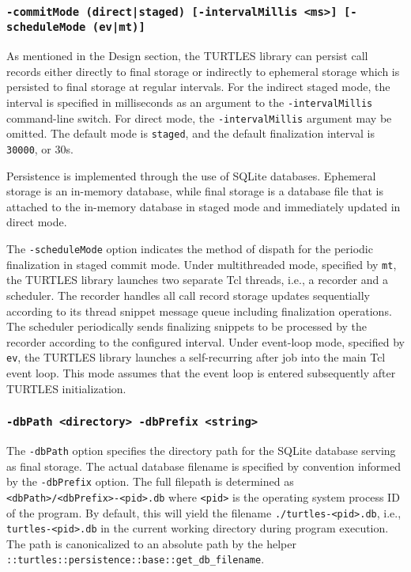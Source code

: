 \documentclass{article}[letter,10pt]
\begin{document}
{{    \subsubsection{\texttt{-commitMode (direct|staged) [-intervalMillis <ms>] [-scheduleMode (ev|mt)]}}{
      As mentioned in the Design section, the TURTLES library can persist call records
      either directly to final storage or indirectly to ephemeral storage which is
      persisted to final storage at regular intervals. For the indirect staged mode,
      the interval is specified in milliseconds as an argument to the \texttt{-intervalMillis}
      command-line switch. For direct mode, the \texttt{-intervalMillis} argument may be
      omitted. The default mode is \texttt{staged}, and the default finalization
      interval is \texttt{30000}, or 30s.

      Persistence is implemented through the use of SQLite databases. Ephemeral
      storage is an in-memory database, while final storage is a database file
      that is attached to the in-memory database in staged mode and immediately
      updated in direct mode.

      The \texttt{-scheduleMode} option indicates the method of dispath for the periodic
      finalization in staged commit mode. Under multithreaded mode, specified by \texttt{mt},
      the TURTLES library launches two separate Tcl threads, i.e., a recorder and a scheduler.
      The recorder handles all call record storage updates sequentially according to its thread
      snippet message queue including finalization operations. The scheduler periodically sends
      finalizing snippets to be processed by the recorder according to the configured interval.
      Under event-loop mode, specified by \texttt{ev}, the TURTLES library launches a self-recurring
      after job into the main Tcl event loop. This mode assumes that the event loop is entered
      subsequently after TURTLES initialization.
    }
    \subsubsection{\texttt{-dbPath <directory> -dbPrefix <string>}}{
      The \texttt{-dbPath} option specifies the directory path for the SQLite database serving
      as final storage. The actual database filename is specified by convention
      informed by the \texttt{-dbPrefix} option. The full filepath is
      determined as \texttt{<dbPath>/<dbPrefix>-<pid>.db} where \texttt{<pid>}
      is the operating system process ID of the program. By default, this will
      yield the filename \texttt{./turtles-<pid>.db}, i.e., \texttt{turtles-<pid>.db}
      in the current working directory during program execution. The path is canonicalized
      to an absolute path by the helper \texttt{::turtles::persistence::base::get\_db\_filename}.
    }
}}
\end{document}
